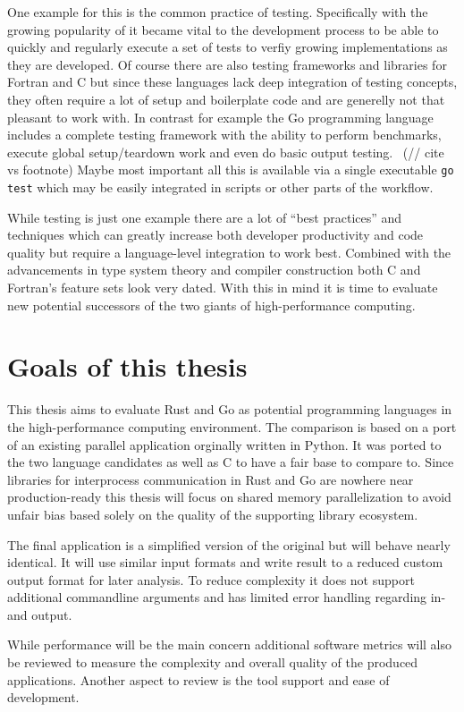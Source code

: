 One example for this is the common practice of testing. Specifically with the growing popularity of  it became vital to the development process to be able to quickly and regularly execute a set of tests to verfiy growing implementations as they are developed. Of course there are also testing frameworks and libraries for Fortran and C but since these languages lack deep integration of testing concepts, they often require a lot of setup and boilerplate code and are generelly not that pleasant to work with. In contrast for example the Go programming language includes a complete testing framework with the ability to perform benchmarks, execute global setup/teardown work and even do basic output testing.~\cite{go_doc_testing} (// cite vs footnote) Maybe most important all this is available via a single executable \lstinline$go test$ which may be easily integrated in scripts or other parts of the workflow.

While testing is just one example there are a lot of ``best practices'' and techniques which can greatly increase both developer productivity and code quality but require a language-level integration to work best. Combined with the advancements in type system theory and compiler construction both C and Fortran's feature sets look very dated. With this in mind it is time to evaluate new potential successors of the two giants of high-performance computing.

\section{Goals of this thesis}
\label{sec:Introduction::Goals}

This thesis aims to evaluate Rust and Go as potential programming languages in the high-performance computing environment. The comparison is based on a port of an existing parallel application orginally written in Python. It was ported to the two language candidates as well as C to have a fair base to compare to. Since libraries for interprocess communication in Rust and Go are nowhere near production-ready this thesis will focus on shared memory parallelization to avoid unfair bias based solely on the quality of the supporting library ecosystem.

The final application is a simplified version of the original but will behave nearly identical. It will use similar input formats and write result to a reduced custom output format for later analysis. To reduce complexity it does not support additional commandline arguments and has limited error handling regarding in- and output.

While performance will be the main concern additional software metrics will also be reviewed to measure the complexity and overall quality of the produced applications. Another aspect to review is the tool support and ease of development.

